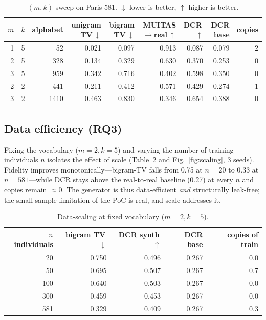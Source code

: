 \documentclass[sigconf,nonacm]{acmart}
\begin{document}
\begin{table}[t]
\caption{$(m,k)$ sweep on Paris-581. $\downarrow$ lower is better, $\uparrow$ higher is better.}
\label{tab:sweep}
\small
\begin{tabular}{@{}rrrrrrrrr@{}}
\toprule
$m$ & $k$ & alphabet & unigram TV\,$\downarrow$ & bigram TV\,$\downarrow$ &
MUITAS$\rightarrow$real\,$\uparrow$ & DCR\,$\uparrow$ & DCR base & copies \\
\midrule
1 & 5 & 52   & 0.021 & 0.097 & 0.913 & 0.087 & 0.079 & 2 \\
2 & 5 & 328  & 0.134 & 0.329 & 0.630 & 0.370 & 0.253 & 0 \\
3 & 5 & 959  & 0.342 & 0.716 & 0.402 & 0.598 & 0.350 & 0 \\
2 & 2 & 441  & 0.211 & 0.412 & 0.571 & 0.429 & 0.274 & 1 \\
3 & 2 & 1410 & 0.463 & 0.830 & 0.346 & 0.654 & 0.388 & 0 \\
\bottomrule
\end{tabular}
\end{table}

\subsection{Data efficiency (RQ3)}
Fixing the vocabulary ($m{=}2,k{=}5$) and varying the number of training individuals $n$ isolates the
effect of scale (Table~\ref{tab:scaling} and Fig.~\ref{fig:scaling}, 3 seeds). Fidelity improves monotonically---bigram-TV falls
from 0.75 at $n{=}20$ to 0.33 at $n{=}581$---while DCR stays above the real-to-real baseline (0.27) at
every $n$ and copies remain $\approx 0$. The generator is thus data-efficient \emph{and} structurally
leak-free; the small-sample limitation of the PoC is real, and scale addresses it.

\begin{table}[t]
\caption{Data-scaling at fixed vocabulary ($m{=}2,k{=}5$).}
\label{tab:scaling}
\small
\begin{tabular}{@{}rrrrr@{}}
\toprule
$n$ individuals & bigram TV\,$\downarrow$ & DCR synth\,$\uparrow$ & DCR base & copies of train \\
\midrule
20  & 0.750 & 0.496 & 0.267 & 0.0 \\
50  & 0.695 & 0.507 & 0.267 & 0.7 \\
100 & 0.640 & 0.503 & 0.267 & 0.0 \\
300 & 0.459 & 0.453 & 0.267 & 0.0 \\
581 & 0.329 & 0.409 & 0.267 & 0.3 \\
\bottomrule
\end{tabular}
\end{table}
\end{document}
